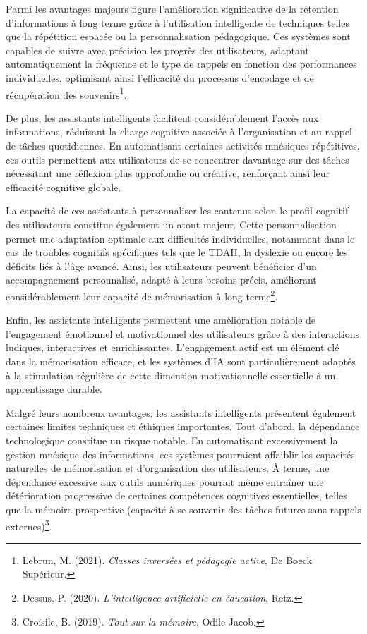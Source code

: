 \documentclass[11pt,a4paper]{report}
\begin{document}
Parmi les avantages majeurs figure l’amélioration significative de la rétention d’informations à long terme grâce à l'utilisation intelligente de techniques telles que la répétition espacée ou la personnalisation pédagogique. Ces systèmes sont capables de suivre avec précision les progrès des utilisateurs, adaptant automatiquement la fréquence et le type de rappels en fonction des performances individuelles, optimisant ainsi l’efficacité du processus d’encodage et de récupération des souvenirs\footnote{Lebrun, M. (2021). \textit{Classes inversées et pédagogie active}, De Boeck Supérieur.}.

De plus, les assistants intelligents facilitent considérablement l’accès aux informations, réduisant la charge cognitive associée à l’organisation et au rappel de tâches quotidiennes. En automatisant certaines activités mnésiques répétitives, ces outils permettent aux utilisateurs de se concentrer davantage sur des tâches nécessitant une réflexion plus approfondie ou créative, renforçant ainsi leur efficacité cognitive globale.

La capacité de ces assistants à personnaliser les contenus selon le profil cognitif des utilisateurs constitue également un atout majeur. Cette personnalisation permet une adaptation optimale aux difficultés individuelles, notamment dans le cas de troubles cognitifs spécifiques tels que le TDAH, la dyslexie ou encore les déficits liés à l’âge avancé. Ainsi, les utilisateurs peuvent bénéficier d’un accompagnement personnalisé, adapté à leurs besoins précis, améliorant considérablement leur capacité de mémorisation à long terme\footnote{Dessus, P. (2020). \textit{L’intelligence artificielle en éducation}, Retz.}.

Enfin, les assistants intelligents permettent une amélioration notable de l’engagement émotionnel et motivationnel des utilisateurs grâce à des interactions ludiques, interactives et enrichissantes. L’engagement actif est un élément clé dans la mémorisation efficace, et les systèmes d’IA sont particulièrement adaptés à la stimulation régulière de cette dimension motivationnelle essentielle à un apprentissage durable.

Malgré leurs nombreux avantages, les assistants intelligents présentent également certaines limites techniques et éthiques importantes. Tout d’abord, la dépendance technologique constitue un risque notable. En automatisant excessivement la gestion mnésique des informations, ces systèmes pourraient affaiblir les capacités naturelles de mémorisation et d’organisation des utilisateurs. À terme, une dépendance excessive aux outils numériques pourrait même entraîner une détérioration progressive de certaines compétences cognitives essentielles, telles que la mémoire prospective (capacité à se souvenir des tâches futures sans rappels externes)\footnote{Croisile, B. (2019). \textit{Tout sur la mémoire}, Odile Jacob.}.
\end{document}
